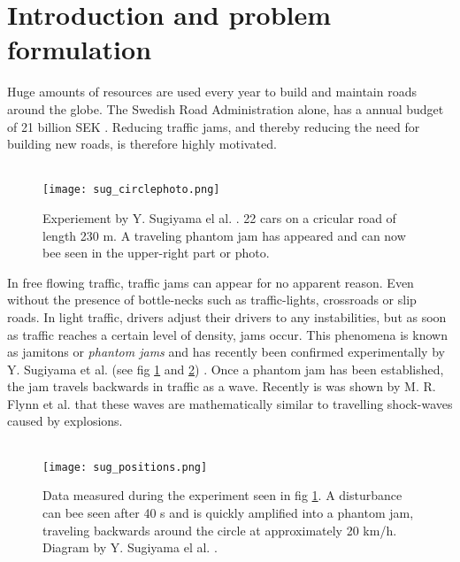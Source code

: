 \section{Introduction and problem formulation}

Huge amounts of resources are used every year to build and maintain roads
around the globe. The Swedish Road Administration alone, has a annual budget
of 21 billion SEK \cite{vagverket}. Reducing traffic jams, and thereby
reducing the need for building new roads, is therefore highly motivated.\\\\

\begin{figure}[H]
    \begin{center}
    \texttt{[image: sug\_circlephoto.png]}
    \caption{\label{sug_photo}
Experiement by Y. Sugiyama el al. \cite{sugiyama}. 22 cars on a cricular road
of length 230 m. A traveling phantom jam has appeared and can now bee seen in
the upper-right part or photo.
} \end{center} \end{figure}

In free flowing traffic, traffic jams can appear for no apparent reason. Even
without the presence of bottle-necks such as traffic-lights, crossroads or
slip roads. In light traffic, drivers adjust their drivers to any
instabilities, but as soon as traffic reaches a certain level of density, jams
occur. This phenomena is known as jamitons or \emph{phantom jams} and has
recently been confirmed experimentally by Y. Sugiyama et al. (see fig
\ref{sug_photo} and \ref{sug_positions}) \cite{sugiyama}. Once a phantom jam has been
established, the jam travels backwards in traffic as a wave. Recently is was
shown by M. R. Flynn et al. \cite{mit} that these waves are mathematically
similar to travelling shock-waves caused by explosions.\\\\

\begin{figure}[H]
    \begin{center}
    \texttt{[image: sug\_positions.png]}
    \caption{\label{sug_positions}
Data measured during the experiment seen in fig \ref{sug_photo}. A disturbance
can bee seen after 40 s and is quickly amplified into a phantom jam, traveling
backwards around the circle at approximately 20 km/h.
Diagram by Y. Sugiyama el al. \cite{sugiyama}.}
\end{center} \end{figure}

